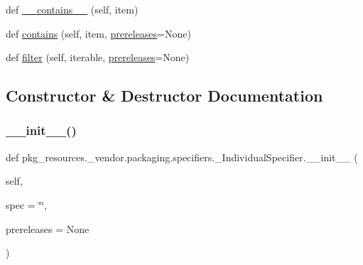 \begin{DoxyCompactItemize}
def \hyperlink{classpkg__resources_1_1__vendor_1_1packaging_1_1specifiers_1_1__IndividualSpecifier_a998cb585da2ce2cbddd8788ab1dec2e9}{\+\_\+\+\_\+contains\+\_\+\+\_\+} (self, item)
\item 
def \hyperlink{classpkg__resources_1_1__vendor_1_1packaging_1_1specifiers_1_1__IndividualSpecifier_afc614431c7e139a948866248f6f01bb4}{contains} (self, item, \hyperlink{classpkg__resources_1_1__vendor_1_1packaging_1_1specifiers_1_1__IndividualSpecifier_a8cca74d9dafa725b0cb9160decd0aab6}{prereleases}=None)
\item 
def \hyperlink{classpkg__resources_1_1__vendor_1_1packaging_1_1specifiers_1_1__IndividualSpecifier_a23722d79e6f85960e214288f3b782962}{filter} (self, iterable, \hyperlink{classpkg__resources_1_1__vendor_1_1packaging_1_1specifiers_1_1__IndividualSpecifier_a8cca74d9dafa725b0cb9160decd0aab6}{prereleases}=None)
\end{DoxyCompactItemize}


\subsection{Constructor \& Destructor Documentation}
\mbox{\label{classpkg__resources_1_1__vendor_1_1packaging_1_1specifiers_1_1__IndividualSpecifier_a8c802e924c48d03d87a2571beaa2e91e}} 
\subsubsection{\texorpdfstring{\+\_\+\+\_\+init\+\_\+\+\_\+()}{\_\_init\_\_()}}
{\footnotesize\ttfamily def pkg\+\_\+resources.\+\_\+vendor.\+packaging.\+specifiers.\+\_\+\+Individual\+Specifier.\+\_\+\+\_\+init\+\_\+\+\_\+ (\begin{DoxyParamCaption}\item[{}]{self,  }\item[{}]{spec = {\ttfamily \char`\"{}\char`\"{}},  }\item[{}]{prereleases = {\ttfamily None} }\end{DoxyParamCaption})}



